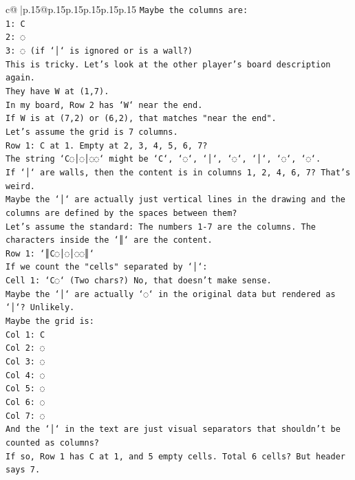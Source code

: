 \documentclass{article}
\begin{document}
{\begin{supertabular}{c@{$\;$}|p{.15\linewidth}@{}p{.15\linewidth}p{.15\linewidth}p{.15\linewidth}p{.15\linewidth}p{.15\linewidth}}
{{{\texttt{Maybe the columns are:} \\
\texttt{1: C} \\
\texttt{2: ◌} \\
\texttt{3: ◌ (if `│` is ignored or is a wall?)} \\
\texttt{This is tricky. Let's look at the other player's board description again.} \\
\texttt{They have W at (1,7).} \\
\texttt{In my board, Row 2 has `W` near the end.} \\
\texttt{If W is at (7,2) or (6,2), that matches "near the end".} \\
\texttt{Let's assume the grid is 7 columns.} \\
\texttt{Row 1: C at 1. Empty at 2, 3, 4, 5, 6, 7?} \\
\texttt{The string `C◌│◌│◌◌` might be `C`, `◌`, `│`, `◌`, `│`, `◌`, `◌`.} \\
\texttt{If `│` are walls, then the content is in columns 1, 2, 4, 6, 7? That's weird.} \\
\texttt{Maybe the `│` are actually just vertical lines in the drawing and the columns are defined by the spaces between them?} \\
\texttt{Let's assume the standard: The numbers 1{-}7 are the columns. The characters inside the `║` are the content.} \\
\texttt{Row 1: `║C◌│◌│◌◌║`} \\
\texttt{If we count the "cells" separated by `│`:} \\
\texttt{Cell 1: `C◌` (Two chars?) No, that doesn't make sense.} \\
\texttt{Maybe the `│` are actually `◌` in the original data but rendered as `│`? Unlikely.} \\
\texttt{Maybe the grid is:} \\
\texttt{Col 1: C} \\
\texttt{Col 2: ◌} \\
\texttt{Col 3: ◌} \\
\texttt{Col 4: ◌} \\
\texttt{Col 5: ◌} \\
\texttt{Col 6: ◌} \\
\texttt{Col 7: ◌} \\
\texttt{And the `│` in the text are just visual separators that shouldn't be counted as columns?} \\
\texttt{If so, Row 1 has C at 1, and 5 empty cells. Total 6 cells? But header says 7.} \\
}}}
\end{supertabular}}
\end{document}
